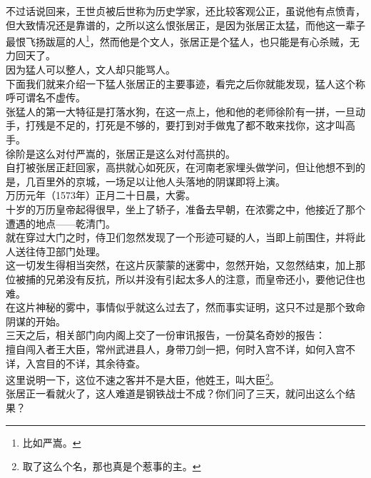 \begin{multicols}{\theparacolNo}
不过话说回来，王世贞被后世称为历史学家，还比较客观公正，虽说他有点愤青，但大致情况还是靠谱的，之所以这么恨张居正，是因为张居正太猛，而他这一辈子最恨飞扬跋扈的人\footnote{比如严嵩。}，然而他是个文人，张居正是个猛人，也只能是有心杀贼，无力回天了。\\

因为猛人可以整人，文人却只能骂人。\\

下面我们就来介绍一下猛人张居正的主要事迹，看完之后你就能发现，猛人这个称呼可谓名不虚传。\\

张猛人的第一大特征是打落水狗，在这一点上，他和他的老师徐阶有一拼，一旦动手，打残是不足的，打死是不够的，要打到对手做鬼了都不敢来找你，这才叫高手。\\

徐阶是这么对付严嵩的，张居正是这么对付高拱的。\\

自打被张居正赶回家，高拱就心如死灰，在河南老家埋头做学问，但让他想不到的是，几百里外的京城，一场足以让他人头落地的阴谋即将上演。\\

万历元年（1573年）正月二十日晨，大雾。\\

十岁的万历皇帝起得很早，坐上了轿子，准备去早朝，在浓雾之中，他接近了那个遭遇的地点——乾清门。\\

就在穿过大门之时，侍卫们忽然发现了一个形迹可疑的人，当即上前围住，并将此人送往侍卫部门处理。\\

这一切发生得相当突然，在这片灰蒙蒙的迷雾中，忽然开始，又忽然结束，加上那位被捕的兄弟没有反抗，所以并没有引起太多人的注意，而皇帝还小，要他记住也难。\\

在这片神秘的雾中，事情似乎就这么过去了，然而事实证明，这只不过是那个致命阴谋的开始。\\

三天之后，相关部门向内阁上交了一份审讯报告，一份莫名奇妙的报告：\\

擅自闯入者王大臣，常州武进县人，身带刀剑一把，何时入宫不详，如何入宫不详，入宫目的不详，其余待查。\\

这里说明一下，这位不速之客并不是大臣，他姓王，叫大臣\footnote{取了这么个名，那也真是个惹事的主。}。\\

张居正一看就火了，这人难道是钢铁战士不成？你们问了三天，就问出这么个结果？\\


\end{multicols}
